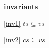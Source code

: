 \textbf{invariants}
\begin{block}
\item[ \eqref{inv1} ]{$ts \subseteq vs $} %
\item[ \eqref{inv2} ]{$cs \subseteq vs$} %
\end{block}
